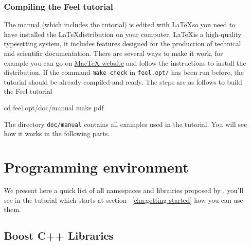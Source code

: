 \subsubsection{Compiling the Feel tutorial}
\label{sec:comp-feel-tutor}
The manual (which includes the tutorial) is edited with \LaTeX  so you need to have installed the \LaTeX  distribution on your computer. \LaTeX  is a high-quality typesetting system, it includes features designed for the production of technical and scientific documentation. There are several ways to make it work, for example you can go on \href{http://www.tug.org/mactex/}{MacTeX website} and follow the instructions to install the distribution. If the command \verb|make check| in \verb|feel.opt/| has been run before, the tutorial
should be already compiled and ready. The steps are as follows to build the Feel tutorial
\begin{unixcom}
  cd feel.opt/doc/manual
  make pdf
\end{unixcom}
%
The directory \verb|doc/manual| contains all examples used in the tutorial. You will see how it works in the following parts.

\section{Programming environment}
\label{sec:progr-envir}
We present here a quick list of all namespaces and librairies proposed by \feel, you'll see in the tutorial which starts at section ~\ref{cha:getting-started} how you can use them.
\subsection{Boost C++ Libraries}
\label{sec:boost-c++-libraries}


